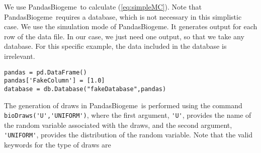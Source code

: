 \documentclass[12pt,a4paper]{article}
\newcommand{\req}[1]{(\ref{#1})}
\newcommand{\PBIOGEME}{PandasBiogeme}
\begin{document}
We use \PBIOGEME\ to calculate \req{eq:simpleMC}. Note that
\PBIOGEME\ requires a database, which is not necessary in this simplistic
case. We
use the simulation mode of \PBIOGEME. It generates output for each
row of the data file. In our case, we just need one output, so that we
take any database.
For this specific example, the data included in the database is
irrelevant.

\begin{lstlisting}
pandas = pd.DataFrame()
pandas['FakeColumn'] = [1.0]
database = db.Database("fakeDatabase",pandas)
\end{lstlisting}


The generation of draws in \PBIOGEME\ is performed using
the command \lstinline$bioDraws('U','UNIFORM')$, where the first argument,
\lstinline$'U'$, provides the name of the random variable associated
with the draws, and the second argument, \lstinline$'UNIFORM'$,
provides the  distribution of the random variable.
Note that the valid keywords for the type of draws are 
\end{document}
